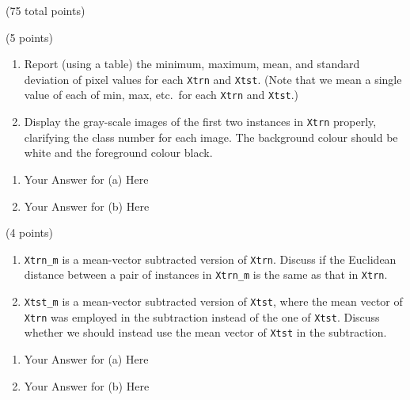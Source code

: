 \documentclass[12pt]{article}
\begin{document}
  \begin{question}{(75 total points) \qTwoTitle}



%
%
\medskip
\begin{subquestion}{(5 points)
  } \label{q2.1}
  \begin{enumerate}\NARROWITEM
  \item Report (using a table) the minimum, maximum, mean, and standard deviation of pixel values for each {\tt Xtrn} and {\tt Xtst}.
    (Note that we mean a single value of each of min, max, etc.\ for each {\tt Xtrn} and {\tt Xtst}.)
  \item Display the gray-scale images of the first two instances in {\tt Xtrn} properly, clarifying the class number for each image.
    The background colour should be white and the foreground colour black.
  \end{enumerate}
   

  \begin{answerbox}{0.55\textheight}
    \begin{enumerate}
    \item Your Answer for (a) Here
    \item Your Answer for (b) Here
    \end{enumerate}
  \end{answerbox}
  


\end{subquestion}

\begin{subquestion}{(4 points)
  } \label{q2.2}
  \begin{enumerate}\NARROWITEM
  \item {\tt Xtrn\_m} is a mean-vector subtracted version of {\tt Xtrn}.
    Discuss if the Euclidean distance between a pair of instances in {\tt Xtrn\_m} is the same as that in {\tt Xtrn}.
  \item {\tt Xtst\_m} is a mean-vector subtracted version of {\tt Xtst}, where the mean vector of {\tt Xtrn} was employed in the subtraction instead of the one of {\tt Xtst}.
    Discuss whether we should instead use the mean vector of {\tt Xtst} in the subtraction.
  \end{enumerate}
   

  \begin{answerbox}{0.5\textheight}
    \begin{enumerate}
    \item Your Answer for (a) Here
    \item Your Answer for (b) Here
    \end{enumerate}
  \end{answerbox}
  



\end{subquestion}
\end{question}
\end{document}
